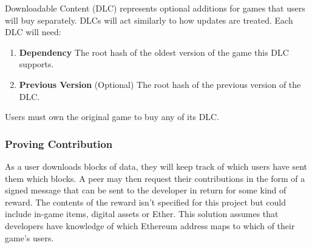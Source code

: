 Downloadable Content (DLC)  represents optional additions for games that users will buy separately. DLCs will act similarly to how updates are treated. Each DLC will need:

\begin{enumerate}
  \item \textbf{Dependency} The root hash of the oldest version of the game this DLC supports.
  \item \textbf{Previous Version} (Optional) The root hash of the previous version of the DLC.
\end{enumerate}

\newparagraph
Users must own the original game to buy any of its DLC. 

\subsubsection*{Proving Contribution}

As a user downloads blocks of data, they will keep track of which users have sent them which blocks. A peer may then request their contributions in the form of a signed message that can be sent to the developer  in return for some kind of reward. The contents of the reward isn't specified for this project but could include in-game items, digital assets or Ether. This solution assumes that developers have knowledge of which Ethereum address maps to which of their game's users.